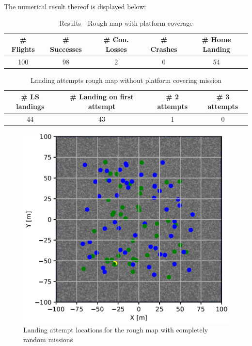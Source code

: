     The numerical result thereof is displayed below:

    \begin{table}[h]
        \begin{center}
         \caption{Results - Rough map with platform coverage}\vspace{1ex}
         \label{tab:result_rough_rand}
         \begin{tabular}{|c|c|c|c|c|}
         \hline
         \# Flights & \# Successes & \# Con. Losses & \# Crashes & \# Home Landing\\ \hline \hline
         100 & 98 & 2 & 0 & 54 \\
         \hline
         \end{tabular}
        \end{center}
    \end{table}

    \begin{table}[h]
        \begin{center}
         \caption{Landing attempts rough map without platform covering mission}\vspace{1ex}
         \label{tab:land_nums_rough_rand}
         \begin{tabular}{|c|c|c|c|}
         \hline
         \# LS landings & \# Landing on first attempt & \# 2 attempts & \# 3 attempts\\ \hline \hline
         44 & 43 & 1 & 0 \\
         \hline
         \end{tabular}
        \end{center}
    \end{table}

    \begin{figure}[h]
    \centering
    \includegraphics[scale=0.5]{images/evaluation/landing_rough_rand.png}
    \caption{Landing attempt locations for the rough map with completely random missions}
    \label{fig:land_rough_rand}
    \end{figure}

